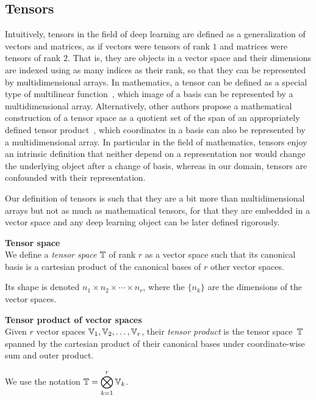 \subsection{Tensors}

Intuitively, tensors in the field of deep learning are defined as a generalization of vectors and matrices, as if vectors were tensors of rank $1$ and matrices were tensors of rank $2$. That is, they are objects in a vector space and their dimensions are indexed using as many indices as their rank, so that they can be represented by multidimensional arrays. In mathematics, a tensor can be defined as a special type of multilinear function~\citep{bass1968cours, marcus1975finite, williamson2015tensor}, which image of a basis can be represented by a multidimensional array. Alternatively, other authors propose a mathematical construction of a tensor space as a quotient set of the span of an appropriately defined tensor product~\citep{hackbusch2012tensor}, which coordinates in a basis can also be represented by a multidimensional array. In particular in the field of mathematics, tensors enjoy an intrinsic definition that neither depend on a representation nor would change the underlying object after a change of basis, whereas in our domain, tensors are confounded with their representation.

Our definition of tensors is such that they are a bit more than multidimensional arrays but not as much as mathematical tensors, for that they are embedded in a vector space and any deep learning object can be later defined rigorously.

\begin{definition}\textbf{Tensor space}\\
We define a \emph{tensor space} $\mathbb{T}$ of rank $r$ as a vector space such that its canonical basis is a cartesian product of the canonical bases of $r$ other vector spaces.

Its shape is denoted $n_1 \times n_2 \times \cdots \times n_r$, where the $\{n_k\}$ are the dimensions of the vector spaces.
\end{definition}

\begin{definition}\textbf{Tensor product of vector spaces}\\
Given $r$ vector spaces $\mathbb{V}_1, \mathbb{V}_2, \ldots, \mathbb{V}_r$, their \emph{tensor product} is the tensor space~$\mathbb{T}$ spanned by the cartesian product of their canonical bases under coordinate-wise sum and outer product.

We use the notation $\mathbb{T} = \displaystyle \bigotimes_{k=1}^r \mathbb{V}_k$.
\end{definition}


